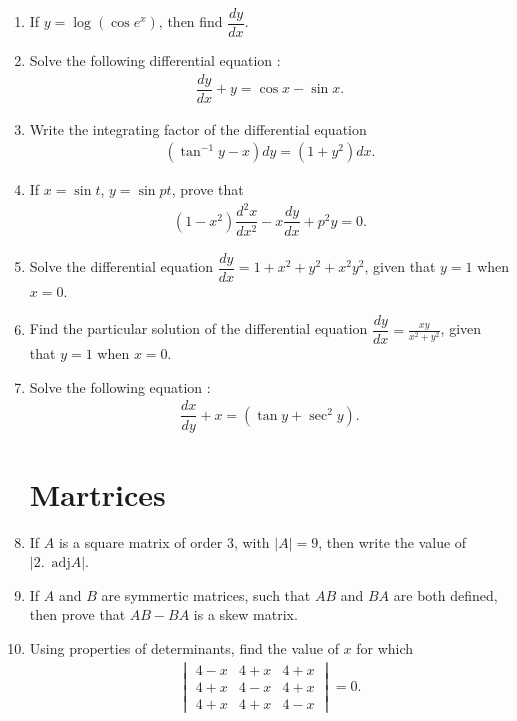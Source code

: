 \documentclass[12pt,-letter paper]{article}
\providecommand{\mydet}[1]{\ensuremath{\begin{vmatrix}#1\end{vmatrix}}}
\providecommand{\brak}[1]{\ensuremath{\left(#1\right)}}
\providecommand{\abs}[1]{\left\vert#1\right\vert}
\begin{document}
\begin{enumerate}
    \item If $y=\log(\cos{e^x})$, then find $\dfrac{dy}{dx}$.

    \item Solve the following differential equation :
     \begin{align*}
         \dfrac{dy}{dx}+y=\cos{x} - \sin{x}.
     \end{align*}

    \item Write the integrating factor of the differential equation
    \begin{align*}
    \brak{\tan^{-1}{y-x}}dy=\brak{1+y^{2}}dx.
    \end{align*}

    \item If $x = \sin{t}$, $y = \sin{pt}$, prove that
    \begin{align*}
    \brak{1-x^{2}}\dfrac{d^{2}x}{dx^{2}}-x\dfrac{dy}{dx}+p^{2}y=0.
    \end{align*}

    \item Solve the differential equation $\dfrac{dy}{dx}=1+x^{2}+y^{2}+x^{2}y^{2}$, given that $ y = 1 $ when $x = 0$.

    \item Find the particular solution of the differential equation $\dfrac{dy}{dx}=\frac{xy}{x^2+y^2}$, given that $y=1$ when $x=0$.

    \item Solve the following  equation :
     \begin{align*}
         \dfrac{dx}{dy}+x=\brak{\tan{y}+\sec^{2}{y}}.
     \end{align*}
 
 
\section{Martrices}
     \item If $A$ is a square matrix of order $3$, with $\abs{A} = 9$, then write the value of $\abs{2.\hspace{6pt}\text{adj}A}$.

     \item If $A$ and $B$ are symmertic matrices, such that $AB$ and $BA$ are both defined, then prove that $AB-BA$ is a skew matrix.

    \item Using properties of determinants, find the value of $x$ for which
    \begin{align*}
        \mydet{4-x&4+x&4+x\\4+x&4-x&4+x\\4+x&4+x&4-x}=0.
    \end{align*}
    

\end{enumerate}
\end{document}
